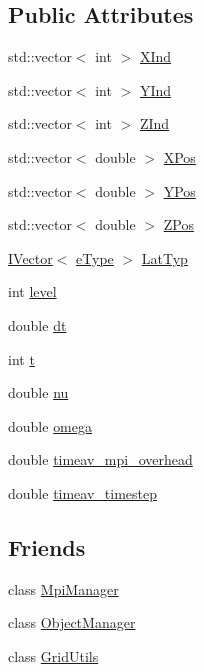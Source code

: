 \subsection*{Public Attributes}
\begin{DoxyCompactItemize}
\item 
std\+::vector$<$ int $>$ \hyperlink{class_grid_obj_ad9bb2153aec972c499ce969a76d908fd}{X\+Ind}
\item 
std\+::vector$<$ int $>$ \hyperlink{class_grid_obj_acf1d07b290887f0d380d046a1d698f0e}{Y\+Ind}
\item 
std\+::vector$<$ int $>$ \hyperlink{class_grid_obj_aef85a27cb2bca6b268469ee96470bb35}{Z\+Ind}
\item 
std\+::vector$<$ double $>$ \hyperlink{class_grid_obj_af31df133bf9419da6222a0dbb4e54bab}{X\+Pos}
\item 
std\+::vector$<$ double $>$ \hyperlink{class_grid_obj_a2bd4e9b575377b8e76e5ebe7a3a31194}{Y\+Pos}
\item 
std\+::vector$<$ double $>$ \hyperlink{class_grid_obj_af859d35bf0a03cee8965ce3e22e651c6}{Z\+Pos}
\item 
\hyperlink{class_i_vector}{I\+Vector}$<$ \hyperlink{_grid_obj_8h_a12f8ec8f0e7a4584b9fe481bb53fa60e}{e\+Type} $>$ \hyperlink{class_grid_obj_a8ce077fba648f767361039eb924c45ae}{Lat\+Typ}
\item 
int \hyperlink{class_grid_obj_a7dfedc4442a386ec15c8b03ca899c1a9}{level}
\item 
double \hyperlink{class_grid_obj_afd504b39f12eb0a237bc6313de94e094}{dt}
\item 
int \hyperlink{class_grid_obj_a783b18a053e244ae7b7b436ab21c0592}{t}
\item 
double \hyperlink{class_grid_obj_a755f85eb5480d959211e00937a478ae9}{nu}
\item 
double \hyperlink{class_grid_obj_a21461e5d39c5ae83ae42170c829e9da3}{omega}
\item 
double \hyperlink{class_grid_obj_a147cfb80b653ca4432432e8185cf38ef}{timeav\+\_\+mpi\+\_\+overhead}
\item 
double \hyperlink{class_grid_obj_a2ad670e6b9bdd28b5060397800170310}{timeav\+\_\+timestep}
\end{DoxyCompactItemize}
\subsection*{Friends}
\begin{DoxyCompactItemize}
\item 
class \hyperlink{class_grid_obj_a831466b4226dde3791b04756e4cfa6fc}{Mpi\+Manager}
\item 
class \hyperlink{class_grid_obj_a8b86bdcdb7c54a536293d8632363e114}{Object\+Manager}
\item 
class \hyperlink{class_grid_obj_a8891d532b9568ad83535721b0e6b79c9}{Grid\+Utils}
\end{DoxyCompactItemize}


